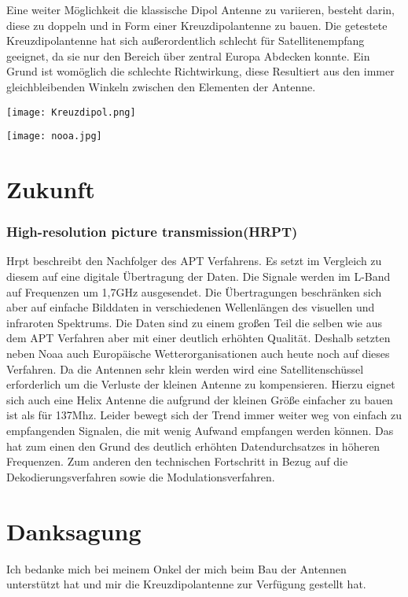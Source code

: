 \begin{multicols*}{2}
    Eine weiter Möglichkeit die klassische Dipol Antenne zu variieren, besteht darin, diese zu doppeln und in Form einer Kreuzdipolantenne zu bauen. Die getestete Kreuzdipolantenne hat sich außerordentlich schlecht für Satellitenempfang geeignet, da sie nur den Bereich über zentral Europa Abdecken konnte. Ein Grund ist womöglich die schlechte Richtwirkung, diese Resultiert aus den immer gleichbleibenden Winkeln zwischen den Elementen der Antenne. 

\end{multicols*}


\begin{center}
    \centering
    \texttt{[image: Kreuzdipol.png]}
\end{center}

\begin{center}
    \centering
    \texttt{[image: nooa.jpg]}
\end{center}


\part{Zukunft}
\section[]{High-resolution picture transmission(HRPT)}

Hrpt beschreibt den Nachfolger des APT Verfahrens. Es setzt im Vergleich zu diesem auf eine digitale Übertragung der Daten. Die Signale werden im L-Band auf Frequenzen um 1,7GHz ausgesendet. Die Übertragungen beschränken sich aber auf einfache Bilddaten in verschiedenen Wellenlängen des visuellen und infraroten Spektrums. Die Daten sind zu einem großen Teil die selben wie aus dem APT Verfahren aber mit einer deutlich erhöhten Qualität. Deshalb setzten neben Noaa auch Europäische Wetterorganisationen auch heute noch auf dieses Verfahren. Da die Antennen sehr klein werden wird eine Satellitenschüssel erforderlich um die Verluste der kleinen Antenne zu kompensieren. Hierzu eignet sich auch eine Helix Antenne die aufgrund der kleinen Größe einfacher zu bauen ist als für 137Mhz. Leider bewegt sich der Trend immer weiter weg von einfach zu empfangenden Signalen, die mit wenig Aufwand empfangen werden können. Das hat zum einen den Grund des deutlich erhöhten Datendurchsatzes in höheren Frequenzen. Zum anderen den technischen Fortschritt in Bezug auf die Dekodierungsverfahren sowie die Modulationsverfahren.  


\part*{Danksagung}

Ich bedanke mich bei meinem Onkel der mich beim Bau der Antennen unterstützt hat und mir die Kreuzdipolantenne zur Verfügung gestellt hat.